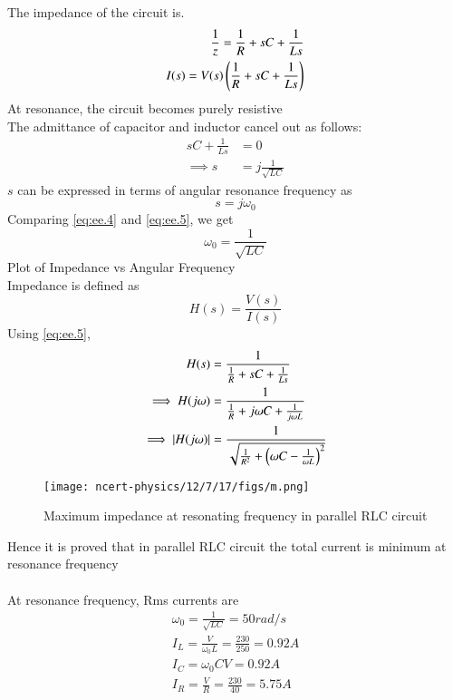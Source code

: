 \documentclass[journal,12pt,twocolumn]{IEEEtran}
\theoremstyle{remark}
\begin{document}

The impedance of the circuit is.
 \begin{align}
     \frac{1}{z}=\frac{1}{R}+sC+\frac{1}{Ls}\\
     I(s)=V(s)\left(\frac{1}{R}+sC+\frac{1}{Ls}\right)
     \label{eq:ee.2}
 \end{align}
At resonance, the circuit becomes purely resistive\\
The admittance of capacitor and inductor cancel out as follows:
  \begin{align}
    sC + \frac{1}{Ls} &= 0\\
\implies s &= j\frac{1}{\sqrt{LC}} \label{eq:ee.4}
\end{align}
$s$ can be expressed in terms of angular resonance frequency as
\begin{equation}
    s = j\omega_0 \label{eq:ee.5}
\end{equation}
Comparing \eqref{eq:ee.4} and \eqref{eq:ee.5}, we get
\begin{equation}
    \omega_0 = \frac{1}{\sqrt{LC}}
\end{equation}
Plot of Impedance vs Angular Frequency\\
Impedance is defined as
\begin{equation}
    H(s) = \frac{V(s)}{I(s)}
\end{equation}
Using \eqref{eq:ee.5},
\begin{align}
     H(s) &=\frac{1}{\frac{1}{R} + sC + \frac{1}{Ls}}\\
     \implies H(j\omega) &=\frac{1}{\frac{1}{R} + j\omega C + \frac{1}{j\omega L}}\\
     \implies \left\vert H(j\omega)\right\vert &= \frac{1}{\sqrt{\frac{1}{R^2} +\left(\omega C - \frac{1}{\omega L}\right)^2}}
\end{align}
\begin{figure}[!ht]
    \centering
    \texttt{[image: ncert-physics/12/7/17/figs/m.png]}
    \caption{Maximum impedance at resonating frequency in parallel RLC circuit}
\end{figure}

Hence it is proved that in parallel RLC circuit the total current is minimum at resonance frequency\\

   \\
  At resonance frequency, Rms currents are\\
\begin{align}
\omega_0=\frac{1}{\sqrt{LC}}= 50rad/s\\
I_L=\frac{V}{\omega_0L}=\frac{230}{250}=0.92A\\
   I_C=\omega_0CV= 0.92 A\\
   I_R=\frac{V}{R}=\frac{230}{40}=5.75A
 \end{align}
\end{document}
